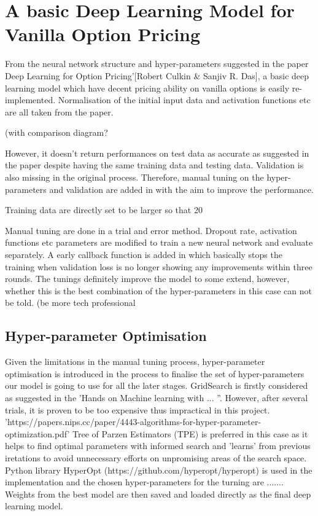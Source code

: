 \documentclass{report}
\begin{document}
\section{A basic Deep Learning Model for Vanilla Option Pricing}
From the neural network structure and hyper-parameters suggested in the paper Deep Learning for Option Pricing’[Robert Culkin & Sanjiv R. Das], a basic deep learning model which have decent pricing ability on vanilla options is easily re-implemented. Normalisation of the initial input data and activation functions etc are all taken from the paper. 

(with comparison diagram? 

However, it doesn't return  performances on test data as accurate as suggested in the paper despite having the same training data and testing data. Validation is also missing in the original process. Therefore, manual tuning on the hyper-parameters and validation are added in with the aim to improve the performance.

Training data are directly set to be larger so that 20%

Manual tuning are done in a trial and error method. Dropout rate, activation functions etc parameters are modified to train a new neural network and evaluate separately. A early callback function is added in which basically stops the training when validation loss is no longer showing any improvements within three rounds. The tunings definitely improve the model to some extend, however, whether this is the best combination of the hyper-parameters in this case can not be told. (be more tech professional

\subsection{Hyper-parameter Optimisation}
Given the limitations in the manual tuning process, hyper-parameter optimisation is introduced in the process to finalise the set of hyper-parameters our model is going to use for all the later stages. GridSearch is firstly considered as suggested in the 'Hands on Machine learning with ... ''. However, after several trials, it is proven to be too expensive thus impractical in this project. 'https://papers.nips.cc/paper/4443-algorithms-for-hyper-parameter-optimization.pdf' Tree of Parzen Estimators (TPE) is preferred in this case as it helps to find optimal parameters with informed search and 'learns' from previous iretations to avoid unnecessary efforts on unpromising areas of the search space. Python library HyperOpt (https://github.com/hyperopt/hyperopt) is used in the implementation and the chosen hyper-parameters for the turning are ....... Weights from the best model are then saved and loaded directly as the final deep learning model.
\end{document}
